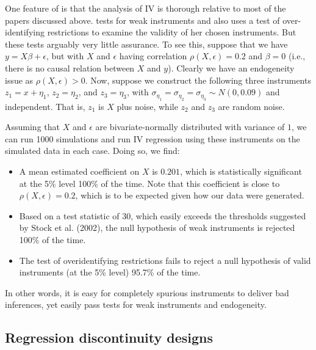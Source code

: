 One feature of \citet{Correia:2014fp} is that the analysis of IV is thorough relative to most of the papers discussed above.  \citet{Correia:2014fp} tests for weak instruments and also uses a test of over-identifying restrictions to examine the validity of her chosen instruments. 
But these tests arguably very little assurance.
To see this, suppose that we have $y = X \beta + \epsilon$, but with $X$ and $\epsilon$ having correlation $\rho(X, \epsilon) = 0.2$ and $\beta = 0$ (i.e., there is no causal relation between $X$ and $y$). Clearly we have an endogeneity issue as $\rho(X, \epsilon) > 0$. 
Now, suppose we construct the following three instruments 
$z_1 = x + \eta_1$, $z_2 = \eta_2$, and $z_3 = \eta_3$, with $\sigma_{\eta_1} = \sigma_{\eta_2} = \sigma_{\eta_3} \sim N(0, 0.09)$ and independent. 
That is, $z_1$ is $X$ plus noise, while $z_2$ and $z_3$ are random noise.

Assuming that $X$ and $\epsilon$ are bivariate-normally distributed with variance of $1$, we can run 1000 simulations and  run IV regression using these instruments on the simulated data in each case. Doing so, we find:
\begin{itemize}
\item A mean estimated coefficient on $X$ is $0.201$, which is statistically significant at the
5\% level 100\% of the time. 
Note that this coefficient is close to $\rho(X, \epsilon) = 0.2$, which is to be expected given how our data were generated.
\item Based on a test statistic of 30, which easily exceeds the thresholds suggested by Stock et al. (2002), the null hypothesis of weak instruments is rejected 100\% of the time. 
\item The test of overidentifying restrictions fails to reject a null hypothesis of valid instruments (at the 5\% level) 95.7\% of the time.
\end{itemize}

In other words, it is easy for completely spurious instruments to deliver bad inferences, yet easily pass tests for weak instruments and endogeneity.

\subsection{Regression discontinuity designs} 

